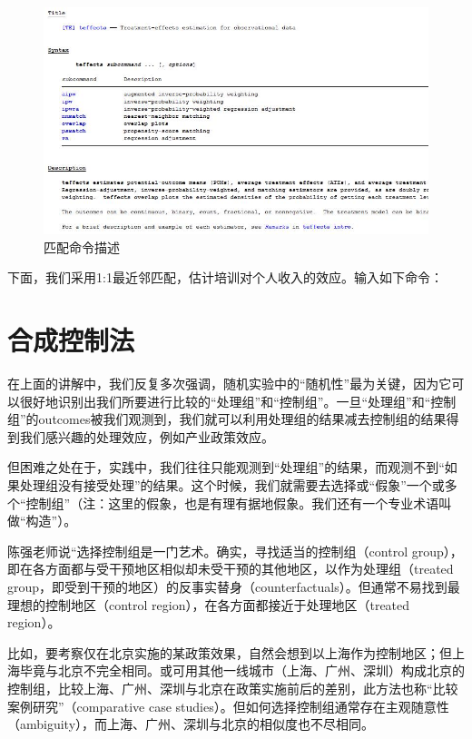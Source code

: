 \documentclass[cn,12pt,math=newtx,citestyle=gb7714-2015,bibstyle=gb7714-2015]{elegantbook}
\begin{document}
	\begin{figure}[htbp]
		\centering
		\includegraphics[width=1\textwidth]{teffects.jpg}
		\caption{匹配命令描述}\label{fig:digit}
	\end{figure}
	
	下面，我们采用1:1最近邻匹配，估计培训对个人收入的效应。输入如下命令：
	
	
	
	
	\section{合成控制法}
	在上面的讲解中，我们反复多次强调，随机实验中的“随机性”最为关键，因为它可以很好地识别出我们所要进行比较的“处理组”和“控制组”。一旦“处理组”和“控制组”的outcomes被我们观测到，我们就可以利用处理组的结果减去控制组的结果得到我们感兴趣的处理效应，例如产业政策效应。
	
	但困难之处在于，实践中，我们往往只能观测到“处理组”的结果，而观测不到“如果处理组没有接受处理”的结果。这个时候，我们就需要去选择或“假象”一个或多个“控制组”（注：这里的假象，也是有理有据地假象。我们还有一个专业术语叫做“构造”）。
	
	陈强老师说“选择控制组是一门艺术。确实，寻找适当的控制组（control group），即在各方面都与受干预地区相似却未受干预的其他地区，以作为处理组（treated group，即受到干预的地区）的反事实替身（counterfactuals）。但通常不易找到最理想的控制地区（control region），在各方面都接近于处理地区（treated region）。
	
	比如，要考察仅在北京实施的某政策效果，自然会想到以上海作为控制地区；但上海毕竟与北京不完全相同。或可用其他一线城市（上海、广州、深圳）构成北京的控制组，比较上海、广州、深圳与北京在政策实施前后的差别，此方法也称“比较案例研究”（comparative case studies）。但如何选择控制组通常存在主观随意性（ambiguity），而上海、广州、深圳与北京的相似度也不尽相同。
	
\end{document}
